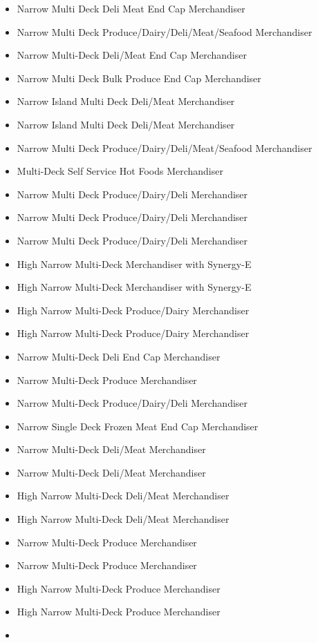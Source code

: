 \begin{itemize}
\item
  Narrow Multi Deck Deli Meat End Cap Merchandiser
\item
  Narrow Multi Deck Produce/Dairy/Deli/Meat/Seafood Merchandiser
\item
  Narrow Multi-Deck Deli/Meat End Cap Merchandiser
\item
  Narrow Multi Deck Bulk Produce End Cap Merchandiser
\item
  Narrow Island Multi Deck Deli/Meat Merchandiser
\item
  Narrow Island Multi Deck Deli/Meat Merchandiser
\item
  Narrow Multi Deck Produce/Dairy/Deli/Meat/Seafood Merchandiser
\item
  Multi-Deck Self Service Hot Foods Merchandiser
\item
  Narrow Multi Deck Produce/Dairy/Deli Merchandiser
\item
  Narrow Multi Deck Produce/Dairy/Deli Merchandiser
\item
  Narrow Multi Deck Produce/Dairy/Deli Merchandiser
\item
  High Narrow Multi-Deck Merchandiser with Synergy-E
\item
  High Narrow Multi-Deck Merchandiser with Synergy-E
\item
  High Narrow Multi-Deck Produce/Dairy Merchandiser
\item
  High Narrow Multi-Deck Produce/Dairy Merchandiser
\item
  Narrow Multi-Deck Deli End Cap Merchandiser
\item
  Narrow Multi-Deck Produce Merchandiser
\item
  Narrow Multi-Deck Produce/Dairy/Deli Merchandiser
\item
  Narrow Single Deck Frozen Meat End Cap Merchandiser
\item
  Narrow Multi-Deck Deli/Meat Merchandiser
\item
  Narrow Multi-Deck Deli/Meat Merchandiser
\item
  High Narrow Multi-Deck Deli/Meat Merchandiser
\item
  High Narrow Multi-Deck Deli/Meat Merchandiser
\item
  Narrow Multi-Deck Produce Merchandiser
\item
  Narrow Multi-Deck Produce Merchandiser
\item
  High Narrow Multi-Deck Produce Merchandiser
\item
  High Narrow Multi-Deck Produce Merchandiser
\item

\end{itemize}
